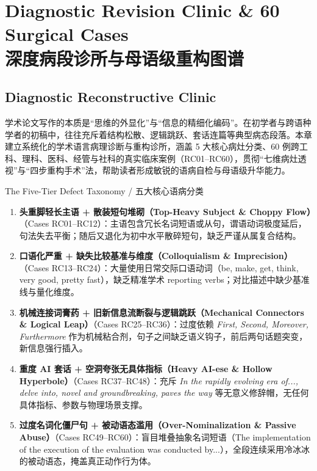 \part{Diagnostic Revision Clinic \& 60 Surgical Cases \\ 深度病段诊所与母语级重构图谱}\label{part:revision_clinic}

\chapter{Diagnostic Reconstructive Clinic}\label{ch:revision_clinic}

学术论文写作的本质是“思维的外显化”与“信息的精细化编码”。在初学者与跨语种学者的初稿中，往往充斥着结构松散、逻辑跳跃、套话连篇等典型病态段落。本章建立系统化的学术语言病理诊断与重构诊所，涵盖 5 大核心病灶分类、60 例跨工科、理科、医科、经管与社科的真实临床案例（RC01--RC60），贯彻“七维病灶透视”与“四步重构手术”法，帮助读者形成敏锐的语病自检与母语级升华能力。

\begin{ConceptBox}{The Five-Tier Defect Taxonomy / 五大核心语病分类}
\begin{enumerate}[label=\textbf{\color{AcadNavy}Category \Roman*:}, leftmargin=2em]
  \item \textbf{头重脚轻长主语 + 散装短句堆砌（Top-Heavy Subject \& Choppy Flow）}（Cases RC01--RC12）：主语包含冗长名词短语或从句，谓语动词极度延后，句法失去平衡；随后又退化为初中水平散碎短句，缺乏严谨从属复合结构。
  \item \textbf{口语化严重 + 缺失比较基准与维度（Colloquialism \& Imprecision）}（Cases RC13--RC24）：大量使用日常交际口语动词（be, make, get, think, very good, pretty fast），缺乏精准学术 reporting verbs；对比描述中缺少基准线与量化维度。
  \item \textbf{机械连接词膏药 + 旧新信息流断裂与逻辑跳跃（Mechanical Connectors \& Logical Leap）}（Cases RC25--RC36）：过度依赖 \textit{First, Second, Moreover, Furthermore} 作为机械粘合剂，句子之间缺乏语义钩子，前后两句话题突变，新信息强行插入。
  \item \textbf{重度 AI 套话 + 空洞夸张无具体指标（Heavy AI-ese \& Hollow Hyperbole）}（Cases RC37--RC48）：充斥 \textit{In the rapidly evolving era of..., delve into, novel and groundbreaking, paves the way} 等无意义修辞帽，无任何具体指标、参数与物理场景支撑。
  \item \textbf{过度名词化僵尸句 + 被动语态滥用（Over-Nominalization \& Passive Abuse）}（Cases RC49--RC60）：盲目堆叠抽象名词短语（The implementation of the execution of the evaluation was conducted by...），全段连续采用冷冰冰的被动语态，掩盖真正动作行为体。
\end{enumerate}
\end{ConceptBox}

